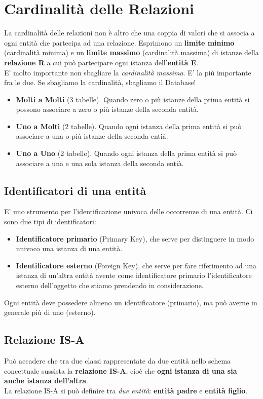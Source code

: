 \documentclass[12pt, a4paper]{article}
\begin{document}
    \section{Cardinalità delle Relazioni}
    La cardinalità delle relazioni non è altro che una coppia di valori che si associa
    a ogni entità che partecipa ad una relazione. 
    Esprimono un \textbf{limite minimo} (cardinalità minima) e un \textbf{limite massimo}
    (cardinalità massima) di istanze della \textbf{relazione R} a cui può partecipare ogni
    istanza dell'\textbf{entità E}.
    \\
    E' molto importante non sbagliare la \textit{cardinalità massima}. E' la più importante fra le due.
    Se sbagliamo la cardinalità, sbagliamo il Database!
    \begin{itemize}
        \item \textbf{Molti a Molti} (3 tabelle). Quando zero o più istanze della prima entità si possono associare a zero o più istanze della seconda entità.
        \item \textbf{Uno a Molti} (2 tabelle). Quando ogni istanza della prima entità si può associare a una o più istanze della seconda entià.
        \item \textbf{Uno a Uno} (2 tabelle). Quando ogni istanza della prima entità si può associare a una e una sola istanza della seconda entià.
    \end{itemize}
    \newpage
    \subsection{Identificatori di una entità}
    E' uno strumento per l'identificazione univoca delle occorrenze di una entità.
    Ci sono due tipi di identificatori:
    \begin{itemize}
        \item \textbf{Identificatore primario} (Primary Key), che serve per distinguere in modo univoco una istanza di una entità.
        \item \textbf{Identificatore esterno} (Foreign Key), che serve per fare riferimento ad una istanza di un'altra entità avente come
        identificatore primario l'identificatore esterno dell'oggetto che stiamo prendendo in considerazione.
    \end{itemize}
    Ogni entità deve possedere almeno un identificatore (primario), ma può averne in generale più di uno (esterno).

    \subsection{Relazione IS-A}
    Può accadere che tra due classi rappresentate da due entità nello schema concettuale sussista la 
    \textbf{relazione IS-A}, cioè che \textbf{ogni istanza di una sia anche istanza dell'altra}.
    \\La relazione IS-A si può definire tra \textit{due entità}: \textbf{entità padre} e \textbf{entità figlio}.
\end{document}
